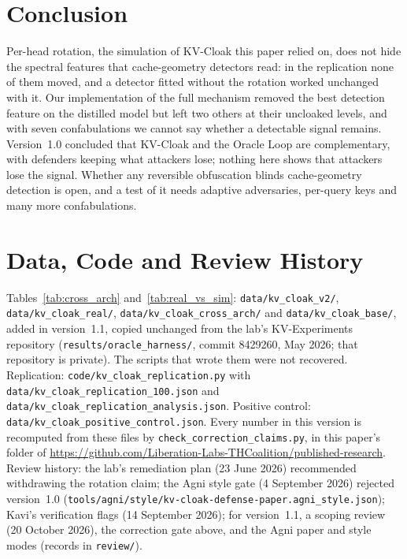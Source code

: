 \section{Conclusion}

Per-head rotation, the simulation of KV-Cloak this paper relied on, does
not hide the spectral features that cache-geometry detectors read: in the
replication none of them moved, and a detector fitted without the rotation
worked unchanged with it. Our implementation of the full mechanism removed
the best detection feature on the distilled model but left two others at
their uncloaked levels, and with seven confabulations we cannot say
whether a detectable signal remains. Version~1.0 concluded that KV-Cloak
and the Oracle Loop are complementary, with defenders keeping what
attackers lose; nothing here shows that attackers lose the signal. Whether
any reversible obfuscation blinds cache-geometry detection is open, and a
test of it needs adaptive adversaries, per-query keys and many more
confabulations.

\section*{Data, Code and Review History}

Tables~\ref{tab:cross_arch} and~\ref{tab:real_vs_sim}:
\nolinkurl{data/kv_cloak_v2/}, \nolinkurl{data/kv_cloak_real/},
\nolinkurl{data/kv_cloak_cross_arch/} and \nolinkurl{data/kv_cloak_base/},
added in version~1.1, copied unchanged from the lab's KV-Experiments
repository (\nolinkurl{results/oracle_harness/}, commit 8429260, May 2026;
that repository is private). The scripts that wrote them were not
recovered. Replication: \nolinkurl{code/kv_cloak_replication.py} with
\nolinkurl{data/kv_cloak_replication_100.json} and
\nolinkurl{data/kv_cloak_replication_analysis.json}. Positive control:
\nolinkurl{data/kv_cloak_positive_control.json}. Every number in this
version is recomputed from these files by
\nolinkurl{check_correction_claims.py}, in this paper's folder of
\url{https://github.com/Liberation-Labs-THCoalition/published-research}.
Review history: the lab's remediation plan (23 June 2026) recommended
withdrawing the rotation claim; the Agni style gate (4 September 2026)
rejected version~1.0
(\nolinkurl{tools/agni/style/kv-cloak-defense-paper.agni_style.json});
Kavi's verification flags (14 September 2026); for version~1.1, a scoping
review (20 October 2026), the correction gate above, and the Agni paper
and style modes (records in \texttt{review/}).

